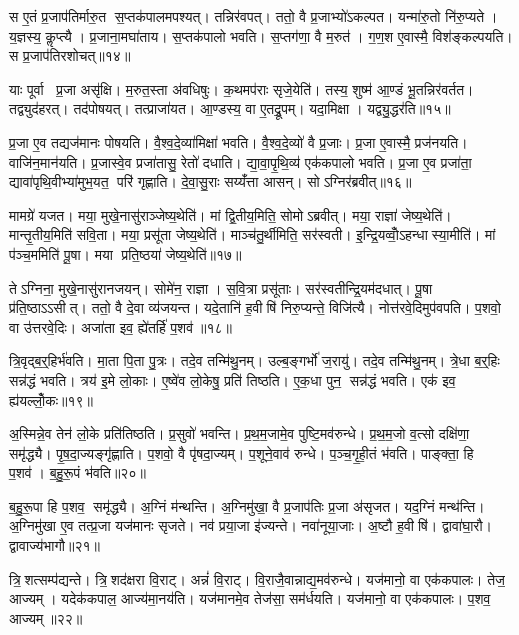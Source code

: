 स ए॒तं प्र॒जाप॑तिर्मारु॒त स॒प्तक॑पालमपश्यत्। तन्निर॑वपत्। ततो॒ वै प्र॒जाभ्यो॑ऽकल्पत। यन्मा॑रु॒तो नि॑रु॒प्यते। य॒ज्ञस्य॒ कॢप्त्यै। प्र॒जाना॒मघा॑ताय। स॒प्तक॑पालो भवति। स॒प्तग॑णा॒ वै म॒रुत॑। ग॒ण॒श ए॒वास्मै॒ विश॑ङ्कल्पयति। स प्र॒जाप॑तिरशोचत्॥१४॥

याः पूर्वा प्र॒जा असृ॑क्षि। म॒रुत॒स्ता अ॑वधिषुः। क॒थमप॑राः सृजे॒येति॑। तस्य॒ शुष्म॑ आ॒ण्डं भू॒तन्निर॑वर्तत। तद्व्युद॑हरत्। तद॑पोषयत्। तत्प्राजा॑यत। आ॒ण्डस्य॒ वा ए॒तद्रू॒पम्। यदा॒मिक्षा। यद्व्यु॒द्धर॑ति॥१५॥

प्र॒जा ए॒व तद्यज॑मानः पोषयति। वै॒श्व॒दे॒व्या॑मिक्षा॑ भवति। वै॒श्व॒दे॒व्यो॑ वै प्र॒जाः। प्र॒जा ए॒वास्मै॒ प्रज॑नयति। वाजि॑न॒मान॑यति। प्र॒जास्वे॒व प्रजा॑तासु॒ रेतो॑ दधाति। द्या॒वा॒पृ॒थि॒व्य॑ एक॑कपालो भवति। प्र॒जा ए॒व प्रजा॑ता॒ द्यावा॑पृथि॒वीभ्या॑मुभ॒यत॒ परि॑ गृह्णाति। दे॒वा॒सु॒राः सय्यँ॑त्ता आसन्। सोऽग्निर॑ब्रवीत्॥१६॥

मामग्रे॑ यजत। मया॒ मुखे॒नासु॑राञ्जेष्य॒थेति॑। मां द्वि॒तीय॒मिति॒ सोमोऽब्रवीत्। मया॒ राज्ञा॑ जेष्य॒थेति॑। मान्तृ॒तीय॒मिति॑ सवि॒ता। मया॒ प्रसू॑ता जेष्य॒थेति॑। माञ्च॑तु॒र्थीमिति॒ सर॑स्वती। इ॒न्द्रि॒यव्वोँ॒ऽहन्धास्या॒मीति॑। मां प॑ञ्च॒ममिति॑ पू॒षा। मया प्रति॒ष्ठया॑ जेष्य॒थेति॑॥१७॥

तेऽग्निना॒ मुखे॒नासु॑रानजयन्। सोमे॑न॒ राज्ञा। स॒वि॒त्रा प्रसू॑ताः। सर॑स्वतीन्द्रि॒यम॑दधात्। पू॒षा प्र॑ति॒ष्ठाऽऽसीत्। ततो॒ वै दे॒वा व्य॑जयन्त। यदे॒तानि॑ ह॒वीषि॑ निरु॒प्यन्ते॒ विजि॑त्यै। नोत्त॑रवे॒दिमुप॑वपति। प॒शवो॒ वा उ॑त्तरवे॒दिः। अजा॑ता इव॒ ह्ये॑तर्\mbox{}हि॑ प॒शव॑॥१८॥\anuvakamend[ऐ॒दित्य॑शोचद्व्यु॒द्धर॑त्यब्रवीत्प्रति॒ष्ठया॑ जेष्य॒थेत्ये॒तर्\mbox{}हि॑ प॒शव॑]

त्रि॒वृद्ब॒र्॒हिर्भ॑वति। मा॒ता पि॒ता पु॒त्रः। तदे॒व तन्मि॑थु॒नम्। उल्ब॒ङ्गर्भो॑ ज॒रायु॑। तदे॒व तन्मि॑थु॒नम्। त्रे॒धा ब॒र्॒हिः सन्न॑द्धं भवति। त्रय॑ इ॒मे लो॒काः। ए॒ष्वे॑व लो॒केषु॒ प्रति॑ तिष्ठति। ए॒क॒धा पुन॒ सन्न॑द्धं भवति। एक॑ इव॒ ह्य॑यल्लोँ॒कः॥१९॥

अ॒स्मिन्ने॒व तेन॑ लो॒के प्रति॑तिष्ठति। प्र॒सुवो॑ भवन्ति। प्र॒थ॒म॒जामे॒व पुष्टि॒मव॑रुन्धे। प्र॒थ॒म॒जो व॒त्सो दक्षि॑णा॒ समृ॑द्ध्यै। पृ॒ष॒दा॒ज्यङ्गृ॑ह्णाति। प॒शवो॒ वै पृ॑षदा॒ज्यम्। प॒शूने॒वाव॑ रुन्धे। प॒ञ्च॒गृ॒ही॒तं भ॑वति। पाङ्क्ता॒ हि प॒शव॑। ब॒हु॒रू॒पं भ॑वति॥२०॥

ब॒हु॒रू॒पा हि प॒शव॒ समृ॑द्ध्यै। अ॒ग्निं म॑न्थन्ति। अ॒ग्निमु॑खा॒ वै प्र॒जाप॑तिः प्र॒जा अ॑सृजत। यद॒ग्निं मन्थ॑न्ति। अ॒ग्निमु॑खा ए॒व तत्प्र॒जा यज॑मानः सृजते। नव॑ प्रया॒जा इ॑ज्यन्ते। नवा॑नूया॒जाः। अ॒ष्टौ ह॒वीषि॑। द्वावा॑घा॒रौ। द्वावाज्य॑भागौ॥२१॥

त्रि॒शत्सम्प॑द्यन्ते। त्रि॒शद॑क्षरा वि॒राट्। अन्नं॑ वि॒राट्। वि॒राजै॒वान्नाद्य॒मव॑रुन्धे। यज॑मानो॒ वा एक॑कपालः। तेज॒ आज्यम्। यदेक॑कपाल॒ आज्य॑मा॒नय॑ति। यज॑मानमे॒व तेज॑सा॒ सम॑र्धयति। यज॑मानो॒ वा एक॑कपालः। प॒शव॒ आज्यम्॥२२॥

